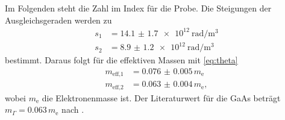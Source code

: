 Im Folgenden steht die Zahl im Index für die Probe. Die Steigungen der Ausgleichsgeraden werden zu
\begin{align*}
    s_1 &= \SI{14.1(17)e12}{\radian\per\cubic\meter} \\
    s_2 &= \SI{8.9(12)e12}{\radian\per\cubic\meter}
\end{align*}
bestimmt. Daraus folgt für die effektiven Massen mit \ref{eq:theta}
\begin{align*}
    m_\text{eff,1} &= \num{0.076(5)} \, m_\text{e} \\
    m_\text{eff,2} &= \num{0.063(4)} \, m_\text{e},
\end{align*}
wobei $m_\text{e}$ die Elektronenmasse ist.
Der Literaturwert für die GaAs beträgt $m_{\Gamma} = \num{0.063} \, m_\text{e}$ nach \cite{ioffe}.
